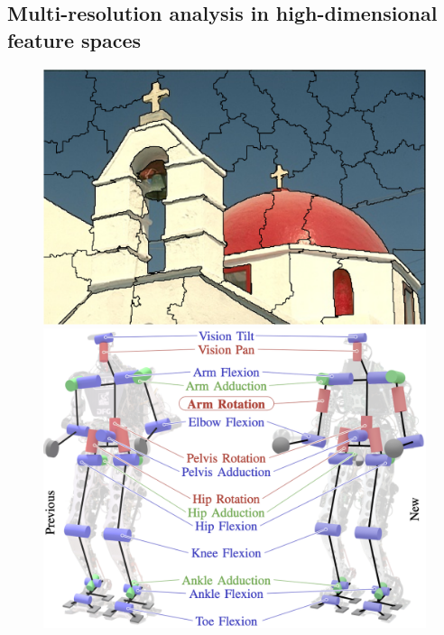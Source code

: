\documentclass[final]{juliacon}
\begin{document}
%
 
%
%
%
%

\subsection{Multi-resolution analysis in high-dimensional feature
  spaces}

%
%
\begin{figure}
%
  \centering
  \begin{minipage}{0.28\linewidth}
    \includegraphics[width=\linewidth]
    {images/scenarios/superpixel.png}
    \vspace*{0.5em}
    \includegraphics[width=\linewidth]
    {images/scenarios/robotics.png}
  \end{minipage}

\end{figure}
\end{document}
